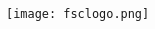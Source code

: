 \documentclass[12pt]{article}
\newcommand{\programnumber}[2]{{
  \vspace{0.2in}
  \textbf{#1}\\
  {\footnotesize #2}
}}
\begin{document}
\begin{multicols*}{2}
\begin{center}
\vspace{0.2in}

\begin{large}
{\bfseries
}
\end{large}

\vspace{0.7in}

\texttt{[image: fsclogo.png]}

\end{center}

\vfill\null
\columnbreak



\begin{center}



\end{center}
\end{multicols*}
\end{document}
